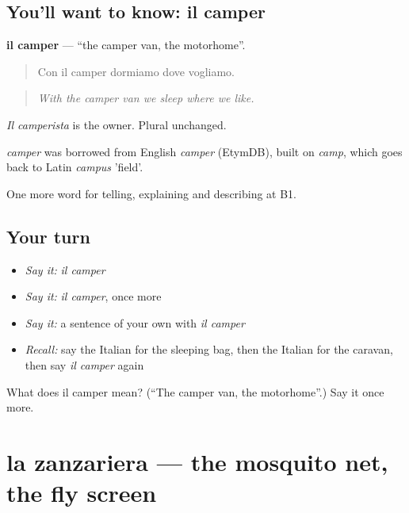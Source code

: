 \subsection*{You'll want to know: il camper}
\textbf{il camper} — \textquotedblleft{}the camper van, the motorhome\textquotedblright{}.

\begin{quote}
Con il camper dormiamo dove vogliamo.
\end{quote}

\begin{quote}
\emph{With the camper van we sleep where we like.}
\end{quote}

\emph{Il camperista} is the owner. Plural unchanged.

\begin{cousinweb}
\emph{camper} was borrowed from English \emph{camper} (EtymDB), built on \emph{camp}, which goes back to Latin \emph{campus} 'field'.
\end{cousinweb}

\begin{grammarlens}[title={What you've built}]
One more word for telling, explaining and describing at B1.
\end{grammarlens}

\subsection*{Your turn}
\begin{itemize}
\raggedright
  \item \emph{Say it:} \emph{il camper}
  \item \emph{Say it:} \emph{il camper}, once more
  \item \emph{Say it:} a sentence of your own with \emph{il camper}
  \item \emph{Recall:} say the Italian for the sleeping bag, then the Italian for the caravan, then say \emph{il camper} again
\end{itemize}

\begin{tcolorbox}[breakable,colback=teal!4,colframe=teal!35!black,title={Before you move on}]
What does il camper mean? (\textquotedblleft{}The camper van, the motorhome\textquotedblright{}.) Say it once more.
\end{tcolorbox}
\section[la zanzariera]{la zanzariera — the mosquito net, the fly screen}


